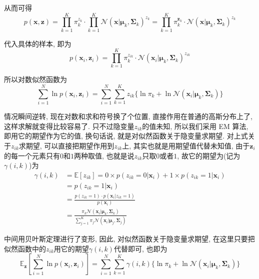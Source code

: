 \documentclass[a4paper,UTF8]{ctexart}
\theoremstyle{plain} \newtheorem{theorem}{定理}[section]
\theoremstyle{plain} \newtheorem{definition}{定义}[section]
\theoremstyle{plain} \newtheorem{lemma}{引理}[section]
\theoremstyle{plain} \newtheorem{proposition}{命题}[section]
\theoremstyle{plain} \newtheorem{example}{例}
\theoremstyle{plain} \newtheorem{remark}{注}
\theoremstyle{plain} \newtheorem{corollary}{推论}[section]
\begin{document}
从而可得
\begin{equation*}
p(\bm{x}, \bm{z}) = \prod_{k=1}^{K} \pi_{k}^{z_{k}} \cdot \prod_{k=1}^{K} \mathcal{N} (\bm{x} | \bm{\mu}_{k}, \bm{\Sigma}_{k})^{z_{k}} = \prod_{k=1}^{K} \pi_{k}^{\bm{z}_{k}} \cdot \mathcal{N} (\bm{x} | \bm{\mu}_{k}, \bm{\Sigma}_{k})^{z_{k}}
\end{equation*}

代入具体的样本, 即为
\begin{equation*}
p(\bm{x}_{i}, \bm{z}_{i}) = \prod_{k=1}^{K} \pi_{k}^{z_{ik}} \cdot \mathcal{N} (\bm{x}_{i} | \bm{\mu}_{k}, \bm{\Sigma}_{k})^{z_{ik}}
\end{equation*}

所以对数似然函数为
\begin{equation*}
\sum_{i=1}^{N} \ln p(\bm{x}_{i},\bm{z}_{i}) = \sum_{i=1}^{N} \sum_{k=1}^{K} z_{ik} \{ \ln \pi_{k} + \ln \mathcal{N} (\bm{x}_{i} | \bm{\mu}_{k}, \bm{\Sigma}_{k}) \}
\end{equation*}

情况瞬间逆转, 现在对数和求和符号换了个位置, 直接作用在普通的高斯分布上了, 这样求解就变得比较容易了. {\color{red}只不过隐变量$z_{ik}$的值未知, 所以我们采用 EM 算法, 即用它的期望作为它的值, 换句话说, 就是对似然函数关于隐变量求期望}. 对上式关于$z_{ik}$求期望, 可以直接把期望作用到$z_{ik}$上, 其实也就是用期望值代替未知值, 由于$\bm{z}_{i}$的每一个元素只有$0$和$1$两种取值, 也就是说$z_{ik}$只取$0$或者$1$, 故它的期望为(记为$\gamma(i, k)$)为
\begin{align}\label{gamma}
\gamma(i, k) & = \mathbb{E} [z_{ik}] = 0 \times p(z_{ik} = 0 | \bm{x}_{i}) + 1 \times p(z_{ik} = 1 | \bm{x}_{i}) \nonumber \\
& = p(z_{ik} = 1 | \bm{x}_{i}) \nonumber \\
& = \frac{p(z_{ik} = 1) \cdot p(\bm{x}_{i} | z_{ik} = 1)}{p(\bm{x}_{i})} \nonumber \\ 
& = \frac{\pi_{k} \mathcal{N}(\bm{x}_{i} | \bm{\mu}_{k},\bm{\Sigma}_{k})}{\sum\limits_{j=1}^{K} \pi_{j} \mathcal{N}(\bm{x}_{i} | \bm{\mu}_{j},\bm{\Sigma}_{j})}
\end{align}

中间用贝叶斯定理进行了变形, 因此, 对似然函数关于隐变量求期望, 在这里只要把似然函数中的$z_{ik}$用它的期望$\gamma(i, k)$代替即可, 也即为
\begin{equation*}
\mathbb{E}_{\bm{z}} \left[\sum_{i=1}^{N} \ln p(\bm{x}_{i},\bm{z}_{i})\right] = \sum_{i=1}^{N} \sum_{k=1}^{K} \gamma(i,k) \{ \ln \pi_{k} + \ln \mathcal{N} (\bm{x}_{i} | \bm{\mu}_{k}, \bm{\Sigma}_{k}) \}
\end{equation*}
\end{document}
